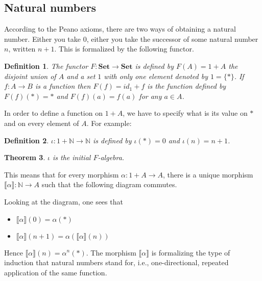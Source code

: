\documentclass[11pt,a4paper]{article}
\newtheorem{theo}{Theorem}
\newtheorem{defi}[theo]{Definition}
\newcommand{\itemz}{\item[$\triangleright$]}
\newcommand{\gr}{\textbf}
\newcommand{\N}{\mathbb{N}}
\newcommand{\lb}{\llbracket}
\newcommand{\rb}{\rrbracket}
\newcommand{\1}{\mathbbm{1}}
\begin{document}
\subsection*{Natural numbers}
According to the Peano axioms, there are two ways of obtaining a natural number. Either you take $0$, either you take the successor of some natural number $n$, written $n+1$. This is formalized by the following functor.
\begin{defi}
The functor $F : \gr{Set} \to \gr{Set}$ is defined by $F(A) = 1 + A$ the disjoint union of $A$ and a set $1$ with only one element denoted by $1 = \{*\}$. If $f : A \to B$ is a function then $F(f) = id_1 + f$ is the function defined by $F(f)(*) = *$ and $F(f)(a) = f(a)$ for any $a \in A$.
\end{defi}
In order to define a function on $1 + A$, we have to specify what is its value on $*$ and on every element of $A$. For example:
\begin{defi} $\iota : 1 + \N \to \N$ is defined by $\iota(*) = 0$ and $\iota(n) = n+1$. \end{defi}
\begin{theo} $\iota$ is the initial $F$-algebra. \end{theo} 
This means that for every morphism $\alpha : 1 + A \to A$, there is a unique morphism $\lb \alpha \rb : \N \to A$ such that the following diagram commutes.
\begin{center}
\end{center} 
Looking at the diagram, one sees that
\begin{itemize}
\setlength\itemsep{-0.3em}
\itemz $\lb \alpha \rb (0) = \alpha(*)$
\itemz $\lb \alpha \rb (n+1) = \alpha(\lb \alpha \rb (n))$
\end{itemize}
Hence $\lb \alpha \rb(n) = \alpha^n(*)$. The morphism $\lb \alpha \rb$ is formalizing the type of induction that natural numbers stand for, i.e., one-directional, repeated application of the same function.
\begin{center}
\end{center} 
\newpage
\end{document}
